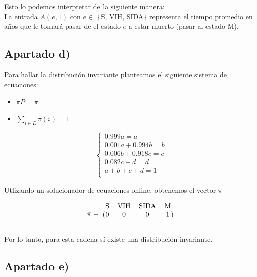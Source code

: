 \documentclass[11pt]{article}
\begin{document}
Esto lo podemos interpretar de la siguiente manera: \\
La entrada $A(e, 1)$ con $e \in$ \{S, VIH, SIDA\} representa el tiempo promedio en años
que le tomará pasar de el estado $e$ a estar muerto (pasar al estado M).


\newpage
\subsection*{Apartado d)}

Para hallar la distribución invariante planteamos el siguiente sistema
de ecuaciones:

\begin{itemize}
  \item $\pi P = \pi$
  \item $\displaystyle\sum_{i \in E} \pi(i) = 1$
\end{itemize}

\[
\begin{cases}
  0.999a = a \\
  0.001a + 0.994b=b \\
  0.006b+0.918c=c \\
  0.082c+d = d \\
  a+b+c+d=1 \\
\end{cases}
\]

Utlizando un solucionador de ecuaciones online, obtenemos el vector $\pi$

\begin{equation*}
  \pi = 
  \begin{blockarray}{cccc}
     \text{S} & \text{VIH} & \text{SIDA} & \text{M} \\
    \begin{block}{(cccc)}
      0 & 0 & 0 & 1 \\
    \end{block}
  \end{blockarray}
\end{equation*}

Por lo tanto, para esta cadena sí existe una distribución invariante.


\subsection*{Apartado e)}
\end{document}
